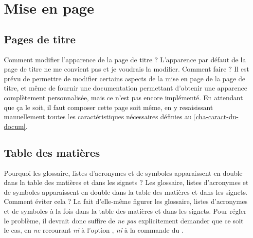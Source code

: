 
\section{Mise en page}
\label{sec-mise-en-page}

\subsection{Pages de titre}
\label{sec-pages-de-titre}

\begin{dbfaq}{Comment modifier l'apparence de la page de titre ?}{}
  L'apparence par défaut de la page de titre ne me convient pas et je voudrais
  la modifier. Comment faire ?
  \tcblower
  Il est prévu de permettre de modifier certains aspects de la mise en page de
  la page de titre, et même de fournir une documentation permettant d'obtenir
  une apparence complètement personnalisée, mais ce n'est pas encore
  implémenté.  En attendant que ça le soit, il faut composer cette page soit
  même, en y resaisissant manuellement toutes les caractéristiques nécessaires
  définies au \vref{cha-caract-du-docum}.
\end{dbfaq}

\subsection{Table des matières}
\label{sec-table-des-matieres-faq}

\begin{dbfaq}{Pourquoi les glossaire, listes d'acronymes et de symboles
    apparaissent en double dans la table des matières et dans les signets ?}{}
  Les glossaire, listes d'acronymes et de symboles apparaissent en double dans
  la table des matières et dans les signets. Comment éviter cela ?%
  \tcblower
  La \yatCl{} fait d'elle-même figurer les glossaire, listes d'acronymes et de
  symboles à la fois dans la table des matières et dans les signets. Pour
  régler le problème, il devrait donc suffire de \emph{ne pas} explicitement
  demander que ce soit le cas, en \emph{ne} recourant \emph{ni} à l'option
  , \emph{ni} à la commande  du
  .
\end{dbfaq}

